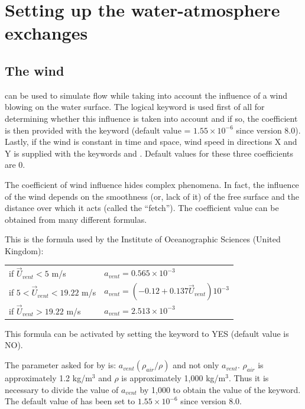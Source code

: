 \section{Setting up the water-atmosphere exchanges}

\subsection{The wind}

 can be used to simulate flow while taking into account the influence
of a wind blowing on the water surface. The logical keyword  is
used first of all for determining whether this influence is taken into account
and if so, the coefficient is then provided with the keyword
 (default value =
$1.55 \times 10^{-6}$ since version 8.0). Lastly, if the
wind is constant in time and space, wind speed in directions X and Y is
supplied with the keywords  and . Default values for these three coefficients are 0.

The coefficient of wind influence hides complex phenomena. In fact, the
influence of the wind depends on the smoothness (or, lack of it) of the free
surface and the distance over which it acts (called the ``fetch''). The
coefficient value can be obtained from many different formulas.

This is the formula used by the Institute of Oceanographic Sciences (United
Kingdom):

\begin{tabular}{ll}
if $\overrightarrow{U}_{vent} < 5$ m/s & $a_{vent}  = 0.565 \times 10^{-3}$ \\
if $5 < \overrightarrow{U}_{vent}  < 19.22$ m/s & $a_{vent} = (- 0.12 + 0.137\overrightarrow{U}_{vent} ) 10^{-3}$ \\
if $\overrightarrow{U}_{vent} > 19.22$ m/s & $a_{vent} = 2.513 \times 10^{-3}$ \\
\end{tabular}

This formula can be activated by setting the keyword
 to YES
(default value is NO).

The parameter  asked for by 
is: $a_{vent} (\rho_{air} / \rho)$ and not only $a_{vent}$.
$\rho_{air}$ is approximately 1.2 kg/m$^3$ and $\rho$
is approximately 1,000 kg/m$^3$. Thus it is necessary to divide the value of
$a_{vent}$ by 1,000 to obtain the value of the  keyword.
The default value of  has been set to
$1.55 \times 10^{-6}$ since version 8.0.

